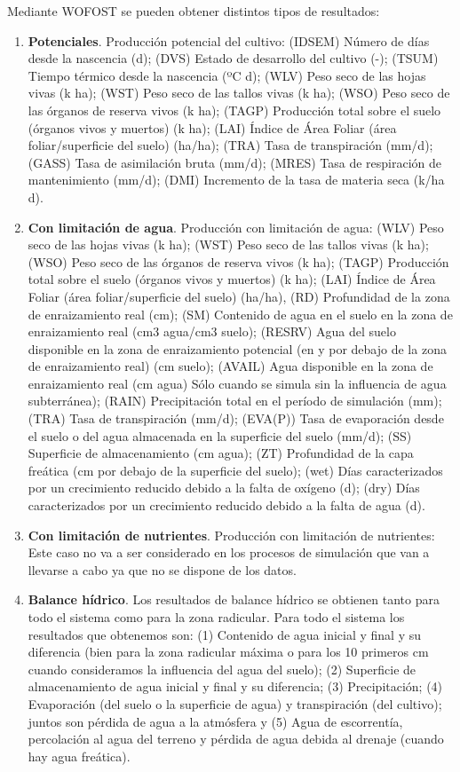 \begin{enumerate}
	Mediante WOFOST se pueden obtener distintos tipos de resultados: 
	\begin{enumerate}
		\item \textbf{Potenciales}. Producción potencial del cultivo: (IDSEM) Número de días desde la nascencia (d); (DVS) Estado de desarrollo del cultivo (-); (TSUM) Tiempo térmico desde la nascencia (ºC d); (WLV) Peso seco de las hojas vivas (k ha); (WST) Peso seco de las tallos vivas (k ha); (WSO) Peso seco de las órganos de reserva vivos (k ha); (TAGP) Producción total sobre el suelo (órganos vivos y muertos) (k ha); (LAI) Índice de Área Foliar (área foliar/superficie del suelo) (ha/ha); (TRA) Tasa de transpiración (mm/d); (GASS) Tasa de asimilación bruta (mm/d); (MRES) Tasa de respiración de mantenimiento (mm/d); (DMI) Incremento de la tasa de materia seca (k/ha d). 
		\item\textbf{ Con limitación de agua}. Producción con limitación de agua: (WLV) Peso seco de las hojas vivas (k ha); (WST) Peso seco de las tallos vivas (k ha); (WSO) Peso seco de las órganos de reserva vivos (k ha); (TAGP) Producción total sobre el suelo (órganos vivos y muertos) (k ha); (LAI) Índice de Área Foliar (área foliar/superficie del suelo) (ha/ha), (RD) Profundidad de la zona de enraizamiento real (cm); (SM) Contenido de agua en el suelo en la zona de enraizamiento real (cm3 agua/cm3 suelo); (RESRV) Agua del suelo disponible en la zona de enraizamiento potencial (en y por debajo de la zona de enraizamiento real) (cm suelo); (AVAIL) Agua disponible en la zona de enraizamiento real (cm agua) Sólo cuando se simula sin la influencia de agua subterránea); (RAIN) Precipitación total en el período de simulación (mm); (TRA) Tasa de transpiración (mm/d); (EVA(P)) Tasa de evaporación desde el suelo o del agua almacenada en la superficie del suelo (mm/d); (SS) Superficie de almacenamiento (cm agua); (ZT) Profundidad de la capa freática (cm por debajo de la superficie del suelo); (wet) Días caracterizados por un crecimiento reducido debido a la falta de oxígeno (d); (dry) Días caracterizados por un crecimiento reducido debido a la falta de agua (d). 
		\item\textbf{ Con limitación de nutrientes}. Producción con limitación de nutrientes: Este caso no va a ser considerado en los procesos de simulación que van a llevarse a cabo ya que no se dispone de los datos. 
		\item\textbf{ Balance hídrico}. Los resultados de balance hídrico se obtienen tanto para todo el sistema como para la zona radicular. Para todo el sistema los resultados que obtenemos son: (1) Contenido de agua inicial y final y su diferencia (bien para la zona radicular máxima o para los 10 primeros cm cuando consideramos la influencia del agua del suelo); (2) Superficie de almacenamiento de agua inicial y final y su diferencia; (3) Precipitación; (4) Evaporación (del suelo o la superficie de agua) y transpiración (del cultivo); juntos son pérdida de agua a la atmósfera y (5) Agua de escorrentía, percolación al agua del terreno y pérdida de agua debida al drenaje (cuando hay agua freática).
		

\end{enumerate}
\end{enumerate}
